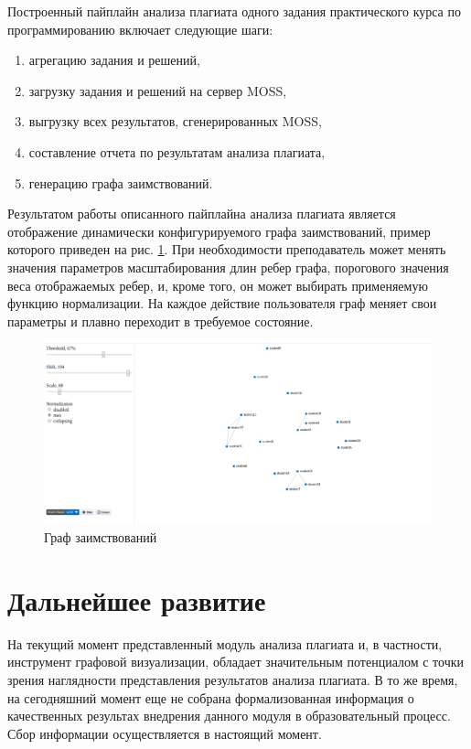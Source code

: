 \documentclass[a4paper,14pt]{extarticle}
\begin{document}
Построенный пайплайн анализа плагиата одного задания практического курса по программированию включает следующие шаги:
\begin{enumerate}
    \item агрегацию задания и решений,
    \item загрузку задания и решений на сервер MOSS,
    \item выгрузку всех результатов, сгенерированных MOSS,
    \item составление отчета по результатам анализа плагиата,
    \item генерацию графа заимствований.
\end{enumerate}

Результатом работы описанного пайплайна анализа плагиата является отображение динамически конфигурируемого графа заимствований, пример которого приведен на рис. \ref{fig:graph}. При необходимости преподаватель может менять значения параметров масштабирования длин ребер графа, порогового значения веса отображаемых ребер, и, кроме того, он может выбирать применяемую функцию нормализации. На каждое действие пользователя граф меняет свои параметры и плавно переходит в требуемое состояние.

\begin{figure}[h!]
\centering
\includegraphics[width=1.0\textwidth]{graph.png}
\caption{Граф заимствований}
\label{fig:graph}
\end{figure}

\section{Дальнейшее развитие}

На текущий момент представленный модуль анализа плагиата и, в частности, инструмент графовой визуализации, обладает значительным потенциалом с точки зрения наглядности представления результатов анализа плагиата. В то же время, на сегодняшний момент еще не собрана формализованная информация о качественных результах внедрения данного модуля в образовательный процесс. Сбор информации осуществляется в настоящий момент.
\end{document}
